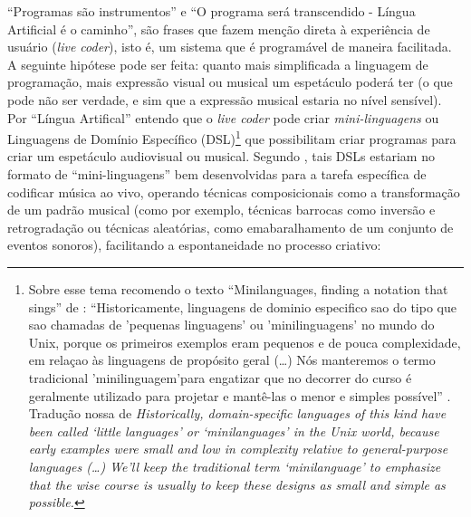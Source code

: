 ``Programas são instrumentos'' e ``O programa será transcendido - Língua Artificial é o caminho'', são frases que fazem menção direta à experiência de usuário (\emph{live coder}), isto é, um sistema que é programável de maneira facilitada. A seguinte hipótese pode ser feita: quanto mais simplificada a linguagem de programação, mais expressão visual ou musical um espetáculo poderá ter (o que pode não ser verdade, e sim que a expressão musical estaria no nível sensível). Por ``Língua Artifical'' entendo que o \emph{live coder} pode criar \emph{mini-linguagens} ou Linguagens de Domínio Específico (DSL)\footnote{Sobre esse tema recomendo o texto ``Minilanguages, finding a notation that sings'' de : ``Historicamente, linguagens de dominio especifico sao do tipo que sao chamadas de 'pequenas linguagens' ou 'minilinguagens' no mundo do Unix, porque os primeiros exemplos eram pequenos e de pouca complexidade, em relaçao às linguagens de propósito geral (\ldots) Nós manteremos o termo tradicional 'minilinguagem'para engatizar que no decorrer do curso é geralmente utilizado para projetar e mantê-las o menor e simples possível'' \cite[$3^o$ parágrafo]{raymond_minilanguages_2003}. Tradução nossa de \emph{Historically, domain-specific languages of this kind have been called ‘little languages’ or ‘minilanguages’ in the Unix world, because early examples were small and low in complexity relative to general-purpose languages (\ldots) We'll keep the traditional term ‘minilanguage’ to emphasize that the wise course is usually to keep these designs as small and simple as possible.}} que possibilitam criar programas para criar um espetáculo audiovisual ou musical. Segundo , tais DSLs estariam no formato de ``mini-linguagens'' bem desenvolvidas para a tarefa específica de codificar música ao vivo, operando técnicas composicionais como a transformação de um padrão musical (como por exemplo, técnicas barrocas como inversão e retrogradação ou técnicas aleatórias, como emabaralhamento de um conjunto de eventos sonoros), facilitando a espontaneidade no processo criativo:

